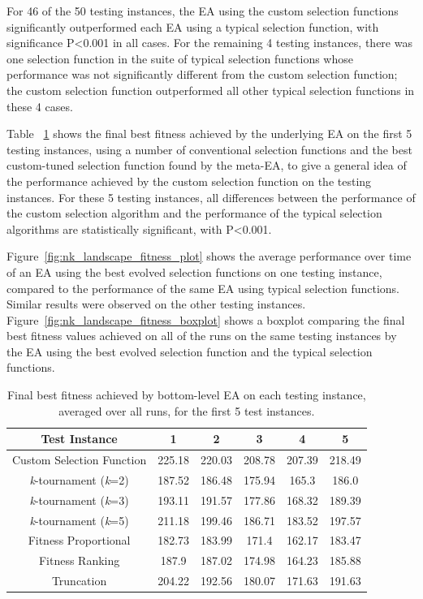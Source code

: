 \documentclass[sigconf]{acmart}
\begin{document}
For 46 of the 50 testing instances, the EA using the custom selection functions significantly outperformed each EA using a typical selection function, with significance P<0.001 in all cases. For the remaining 4 testing instances, there was one selection function in the suite of typical selection functions whose performance was not significantly different from the custom selection function; the custom selection function outperformed all other typical selection functions in these 4 cases. 

Table ~\ref{tab:results} shows the final best fitness achieved by the underlying EA on the first 5 testing instances, using a number of conventional selection functions and the best custom-tuned selection function found by the meta-EA, to give a general idea of the performance achieved by the custom selection function on the testing instances. For these 5 testing instances, all differences between the performance of the custom selection algorithm and the performance of the typical selection algorithms are statistically significant, with P<0.001.

Figure~\ref{fig:nk_landscape_fitness_plot} shows the average performance over time of an EA using the best evolved selection functions on one testing instance, compared to the performance of the same EA using typical selection functions. Similar results were observed on the other testing instances. Figure~\ref{fig:nk_landscape_fitness_boxplot} shows a boxplot comparing the final best fitness values achieved on all of the runs on the same testing instances by the EA using the best evolved selection function and the typical selection functions.

\begin{table}
  \caption{Final best fitness achieved by bottom-level EA on each testing instance, averaged over all runs, for the first 5 test instances.}
  \label{tab:results}
  \begin{tabular}{cccccc}
    \toprule
    Test Instance &1&2&3&4&5\\
    \midrule
    Custom Selection Function & 225.18 & 220.03 & 208.78 & 207.39 & 218.49 \\
	\textit{k}-tournament (\textit{k}=2) & 187.52  & 186.48 & 175.94 & 165.3 & 186.0 \\
	\textit{k}-tournament (\textit{k}=3) & 193.11 & 191.57 & 177.86 & 168.32 & 189.39 \\
	\textit{k}-tournament (\textit{k}=5) & 211.18 & 199.46 & 186.71 & 183.52 & 197.57 \\
	Fitness Proportional & 182.73 & 183.99 & 171.4 & 162.17 & 183.47 \\
	Fitness Ranking & 187.9 & 187.02 & 174.98 & 164.23 & 185.88 \\
	Truncation & 204.22 & 192.56 & 180.07 & 171.63 & 191.63 \\

  \bottomrule
\end{tabular}
\end{table}
\end{document}
